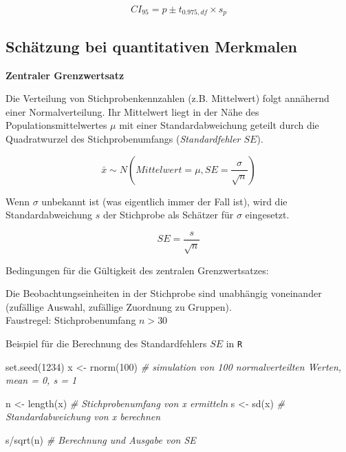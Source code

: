 \documentclass[
]{book}
\newenvironment{Shaded}{\begin{snugshade}}{\end{snugshade}}
\newcommand{\CommentTok}[1]{\textcolor[rgb]{0.56,0.35,0.01}{\textit{#1}}}
\newcommand{\DecValTok}[1]{\textcolor[rgb]{0.00,0.00,0.81}{#1}}
\newcommand{\FunctionTok}[1]{\textcolor[rgb]{0.00,0.00,0.00}{#1}}
\newcommand{\NormalTok}[1]{#1}
\newcommand{\OtherTok}[1]{\textcolor[rgb]{0.56,0.35,0.01}{#1}}
\newcommand{\SpecialCharTok}[1]{\textcolor[rgb]{0.00,0.00,0.00}{#1}}
\begin{document}
\begin{equation}
  CI_{95} = p \pm t_{0.975, df} \times s_p
  \label{eq:ciqualt}
\end{equation}

\hypertarget{schuxe4tzung-bei-quantitativen-merkmalen}{%
\subsection{Schätzung bei quantitativen Merkmalen}\label{schuxe4tzung-bei-quantitativen-merkmalen}}

\textbf{Zentraler Grenzwertsatz}

Die Verteilung von Stichprobenkennzahlen (z.B. Mittelwert) folgt annähernd einer Normalverteilung. Ihr Mittelwert liegt in der Nähe des Populationsmittelwertes \(\mu\) mit einer Standardabweichung geteilt durch die Quadratwurzel des Stichprobenumfangs (\emph{Standardfehler \(SE\)}).

\begin{equation}
  \bar{x} \sim N(Mittelwert = \mu, SE = \frac{\sigma}{\sqrt{n}})
  \label{eq:clt}
\end{equation}

Wenn \(\sigma\) unbekannt ist (was eigentlich immer der Fall ist), wird die Standardabweichung \(s\) der Stichprobe als Schätzer für \(\sigma\) eingesetzt.

\begin{equation}
  SE = \frac{s}{\sqrt{n}}
  \label{eq:se}
\end{equation}

Bedingungen für die Gültigkeit des zentralen Grenzwertsatzes:

Die Beobachtungseinheiten in der Stichprobe sind unabhängig voneinander (zufällige Auswahl, zufällige Zuordnung zu Gruppen).\\
Faustregel: Stichprobenumfang \(n>30\)

Beispiel für die Berechnung des Standardfehlers \(SE\) in \texttt{R}

\begin{Shaded}
\begin{Highlighting}[]
\FunctionTok{set.seed}\NormalTok{(}\DecValTok{1234}\NormalTok{)}
\NormalTok{x }\OtherTok{\textless{}{-}} \FunctionTok{rnorm}\NormalTok{(}\DecValTok{100}\NormalTok{)  }\CommentTok{\# simulation von 100 normalverteilten Werten, mean = 0, s = 1}

\NormalTok{n }\OtherTok{\textless{}{-}} \FunctionTok{length}\NormalTok{(x)   }\CommentTok{\# Stichprobenumfang von x ermitteln}
\NormalTok{s }\OtherTok{\textless{}{-}} \FunctionTok{sd}\NormalTok{(x)       }\CommentTok{\# Standardabweichung von x berechnen}

\NormalTok{s}\SpecialCharTok{/}\FunctionTok{sqrt}\NormalTok{(n)        }\CommentTok{\# Berechnung und Ausgabe von SE}
\end{Highlighting}
\end{Shaded}
\end{document}
